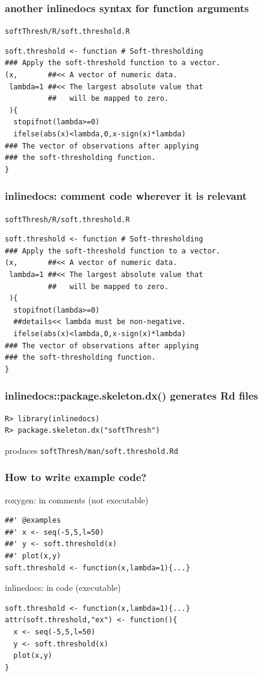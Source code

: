 \documentclass{beamer}
\begin{document}
\begin{frame}[containsverbatim]
  \frametitle{another inlinedocs syntax for function arguments}
  \texttt{softThresh/R/soft.threshold.R}
  \hrulefill
  \small
\begin{verbatim}
soft.threshold <- function # Soft-thresholding
### Apply the soft-threshold function to a vector.
(x,       ##<< A vector of numeric data.
 lambda=1 ##<< The largest absolute value that
          ##   will be mapped to zero.
 ){
  stopifnot(lambda>=0)
  ifelse(abs(x)<lambda,0,x-sign(x)*lambda)
### The vector of observations after applying 
### the soft-thresholding function.
}
\end{verbatim}
\end{frame}

\begin{frame}[containsverbatim]
  \frametitle{inlinedocs: comment code wherever it is relevant}
  \texttt{softThresh/R/soft.threshold.R}
  \hrulefill
  \small
\begin{verbatim}
soft.threshold <- function # Soft-thresholding
### Apply the soft-threshold function to a vector.
(x,       ##<< A vector of numeric data.
 lambda=1 ##<< The largest absolute value that
          ##   will be mapped to zero.
 ){
  stopifnot(lambda>=0)
  ##details<< lambda must be non-negative.
  ifelse(abs(x)<lambda,0,x-sign(x)*lambda)
### The vector of observations after applying 
### the soft-thresholding function.
}
\end{verbatim}
\end{frame}

\begin{frame}[containsverbatim]
  \frametitle{inlinedocs::package.skeleton.dx() generates Rd files}
  \begin{verbatim}
R> library(inlinedocs)
R> package.skeleton.dx("softThresh")
\end{verbatim}
  produces \texttt{softThresh/man/soft.threshold.Rd}
\end{frame}

\begin{frame}[containsverbatim]
  \frametitle{How to write example code?}
    roxygen: in comments (not executable)
    \hrulefill
\begin{verbatim}
##' @examples
##' x <- seq(-5,5,l=50)
##' y <- soft.threshold(x)
##' plot(x,y)
soft.threshold <- function(x,lambda=1){...}
\end{verbatim}
    inlinedocs: in code (executable)
    \hrulefill
    \begin{verbatim}
soft.threshold <- function(x,lambda=1){...}
attr(soft.threshold,"ex") <- function(){
  x <- seq(-5,5,l=50)
  y <- soft.threshold(x)
  plot(x,y)
}
\end{verbatim}
\end{frame}
\end{document}
